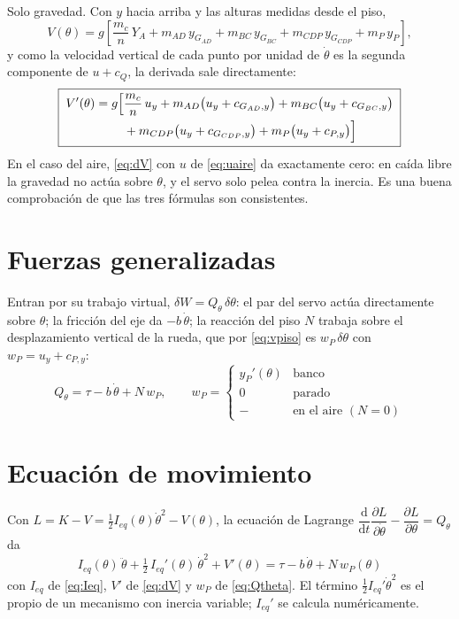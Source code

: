 \documentclass[11pt,a4paper]{article}
\newcommand{\dd}{\mathrm{d}}
\begin{document}
Solo gravedad. Con \(y\) hacia arriba y las alturas medidas desde el piso,
\begin{equation}
V(\theta)=g\left[\frac{m_c}{n}\,Y_A+m_{AD}\,y_{G_{AD}}+m_{BC}\,y_{G_{BC}}+m_{CDP}\,y_{G_{CDP}}+m_P\,y_P\right],
\label{eq:V}
\end{equation}
y como la velocidad vertical de cada punto por unidad de \(\dot\theta\) es la segunda componente de
\(u+c_Q\), la derivada sale directamente:
\begin{equation}
\boxed{\;
\begin{aligned}
V'(\theta)=g\Bigl[&\frac{m_c}{n}\,u_y+m_{AD}\bigl(u_y+c_{G_{AD},y}\bigr)+m_{BC}\bigl(u_y+c_{G_{BC},y}\bigr)\\
&+m_{CDP}\bigl(u_y+c_{G_{CDP},y}\bigr)+m_P\bigl(u_y+c_{P,y}\bigr)\Bigr]
\end{aligned}
\;}
\label{eq:dV}
\end{equation}
En el caso del aire, \eqref{eq:dV} con \(u\) de \eqref{eq:uaire} da exactamente cero: en caída libre la
gravedad no actúa sobre \(\theta\), y el servo solo pelea contra la inercia. Es una buena comprobación de que
las tres fórmulas son consistentes.

\section{Fuerzas generalizadas}

Entran por su trabajo virtual, \(\delta W=Q_\theta\,\delta\theta\): el par del servo actúa directamente sobre
\(\theta\); la fricción del eje da \(-b\,\dot\theta\); la reacción del piso \(N\) trabaja sobre el
desplazamiento vertical de la rueda, que por \eqref{eq:vpiso} es \(w_P\,\delta\theta\) con
\(w_P=u_y+c_{P,y}\):
\begin{equation}
Q_\theta=\tau-b\,\dot\theta+N\,w_P,\qquad
w_P=\begin{cases} y_P'(\theta) & \text{banco}\\ 0 & \text{parado}\\ - & \text{en el aire }(N=0)\end{cases}
\label{eq:Qtheta}
\end{equation}

\section{Ecuación de movimiento}

Con \(L=K-V=\tfrac12 I_{eq}(\theta)\dot\theta^2-V(\theta)\), la ecuación de Lagrange
\(\dfrac{\dd}{\dd t}\dfrac{\partial L}{\partial\dot\theta}-\dfrac{\partial L}{\partial\theta}=Q_\theta\) da
\begin{equation}
\boxed{\;
I_{eq}(\theta)\,\ddot\theta+\tfrac12\,I_{eq}'(\theta)\,\dot\theta^2+V'(\theta)=\tau-b\,\dot\theta+N\,w_P(\theta)
\;}
\label{eq:final}
\end{equation}
con \(I_{eq}\) de \eqref{eq:Ieq}, \(V'\) de \eqref{eq:dV} y \(w_P\) de \eqref{eq:Qtheta}. El término
\(\tfrac12 I_{eq}'\dot\theta^2\) es el propio de un mecanismo con inercia variable; \(I_{eq}'\) se calcula
numéricamente.
\end{document}
